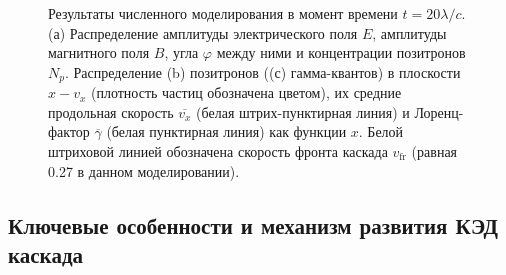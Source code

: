 \begin{figure}[h!]
    \caption[Результаты численного моделирования развития КЭД каскада в плоской волн]{\label{fig:ch2/field-structure} Результаты численного моделирования в момент времени ${t = 20 \lambda / c}$. (а) Распределение амплитуды электрического поля $E$, амплитуды магнитного поля $B$, угла $\varphi$ между ними и концентрации позитронов $N_p$. Распределение (b) позитронов ((с) гамма-квантов) в плоскости $x - v_{x}$ (плотность частиц обозначена цветом), их средние продольная скорость $\overline{v_x}$ (белая штрих-пунктирная линия) и Лоренц-фактор $\overline{\gamma}$ (белая пунктирная линия) как функции $x$. Белой штриховой линией обозначена скорость фронта каскада $v_\mathrm{fr}$ (равная 0.27 в данном моделировании).}
\end{figure}

\begin{figure}[h!]
    \caption{\label{fig:ch2/sec1/tracks} }
\end{figure}

\subsection{Ключевые особенности и механизм развития КЭД каскада}
\label{sub:ch2/sec2/Mechanism}

